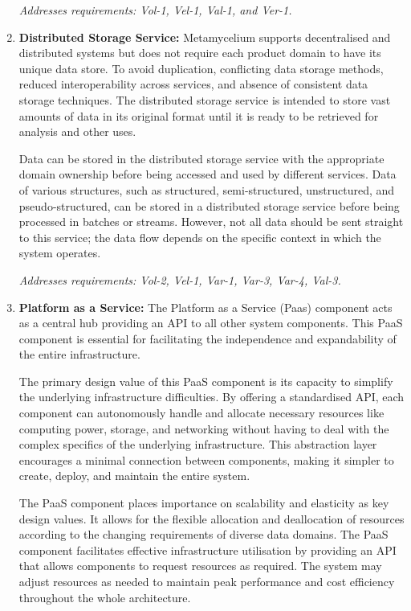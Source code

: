 \documentclass[preprint,12pt]{elsarticle}
\begin{document}
\begin{enumerate}
    \textit{Addresses requirements: Vol-1, Vel-1, Val-1, and Ver-1.} 

    \item \textbf{Distributed Storage Service:} Metamycelium supports decentralised and distributed systems but does not require each product domain to have its unique data store. To avoid duplication, conflicting data storage methods, reduced interoperability across services, and absence of consistent data storage techniques. The distributed storage service is intended to store vast amounts of data in its original format until it is ready to be retrieved for analysis and other uses. 
    
    Data can be stored in the distributed storage service with the appropriate domain ownership before being accessed and used by different services. Data of various structures, such as structured, semi-structured, unstructured, and pseudo-structured, can be stored in a distributed storage service before being processed in batches or streams. However, not all data should be sent straight to this service; the data flow depends on the specific context in which the system operates.
    
    \textit{Addresses requirements: Vol-2, Vel-1, Var-1, Var-3, Var-4, Val-3.} 


    \item \textbf{Platform as a Service:} The Platform as a Service (Paas) component acts as a central hub providing an API to all other system components. This PaaS component is essential for facilitating the independence and expandability of the entire infrastructure.

    The primary design value of this PaaS component is its capacity to simplify the underlying infrastructure difficulties. By offering a standardised API, each component can autonomously handle and allocate necessary resources like computing power, storage, and networking without having to deal with the complex specifics of the underlying infrastructure. This abstraction layer encourages a minimal connection between components, making it simpler to create, deploy, and maintain the entire system.
    
    The PaaS component places importance on scalability and elasticity as key design values. It allows for the flexible allocation and deallocation of resources according to the changing requirements of diverse data domains. The PaaS component facilitates effective infrastructure utilisation by providing an API that allows components to request resources as required. The system may adjust resources as needed to maintain peak performance and cost efficiency throughout the whole architecture.
    

\end{enumerate}
\end{document}
